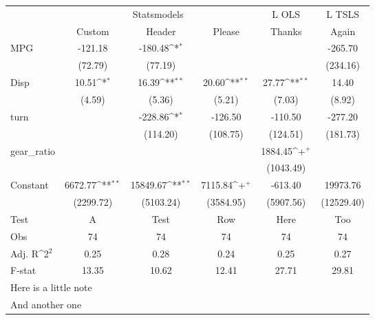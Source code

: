 {
\def\sym#1{\ifmmode^{#1}\else\(^{#1}\)\fi}
\begin{tabular}{@{\extracolsep{2pt}}l*{5}{c}@{}}
\hline\hline
& \multicolumn{3}{c}{Statsmodels} & \multicolumn{1}{c}{L OLS} & \multicolumn{1}{c}{L TSLS} \\
\cline{2-4}
\cline{5-5}
\cline{6-6}
 & Custom & Header & Please & Thanks & Again \\
\hline
MPG & -121.18 & -180.48\sym{*} &  &  & -265.70 \\
 & (72.79) & (77.19) &  &  & (234.16) \\
Disp & 10.51\sym{*} & 16.39\sym{**} & 20.60\sym{**} & 27.77\sym{**} & 14.40 \\
 & (4.59) & (5.36) & (5.21) & (7.03) & (8.92) \\
turn &  & -228.86\sym{*} & -126.50 & -110.50 & -277.20 \\
 &  & (114.20) & (108.75) & (124.51) & (181.73) \\
gear\_ratio &  &  &  & 1884.45\sym{+} &  \\
 &  &  &  & (1043.49) &  \\
Constant & 6672.77\sym{**} & 15849.67\sym{**} & 7115.84\sym{+} & -613.40 & 19973.76 \\
 & (2299.72) & (5103.24) & (3584.95) & (5907.56) & (12529.40) \\
Test & A & Test & Row & Here & Too \\

\hline
Obs & 74 & 74 & 74 & 74 & 74 \\
Adj. R\sym{2} & 0.25 & 0.28 & 0.24 & 0.25 & 0.27 \\
F-stat & 13.35 & 10.62 & 12.41 & 27.71 & 29.81 \\
\hline\hline
\multicolumn{6}{l}{\footnotesize Here is a little note} \\
\multicolumn{6}{l}{\footnotesize And another one} \\
\end{tabular}
}